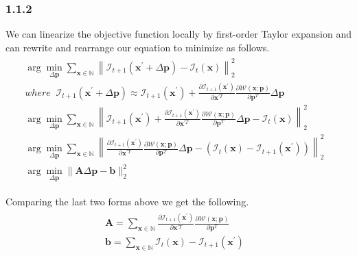 \documentclass[a4paper]{article}
\begin{document}
\subsubsection*{1.1.2}
We can linearize the objective function locally by first-order Taylor expansion and can rewrite and rearrange our equation to minimize as follows.
\begin{gather}
\begin{array}{c}
\arg \min _ { \Delta \mathbf { p } } \sum _ { \mathbf { x } \in \mathbb { N } } \left\| \mathcal { I } _ { t + 1 } ( \mathbf { x } ^ { \prime } + \Delta \mathbf { p } ) - \mathcal { I } _ { t } ( \mathbf { x } ) \right\| _ { 2 } ^ { 2 }
& \\
where \;\; \mathcal { I } _ { t + 1 } \left( \mathbf { x } ^ { \prime } + \Delta \mathbf { p } \right) \approx \mathcal { I } _ { t + 1 } \left( \mathbf { x } ^ { \prime } \right) + \frac { \partial \mathcal { I } _ { t + 1 } \left( \mathbf { x } ^ { \prime } \right) } { \partial \mathbf { x } ^ { \prime T } } \frac { \partial \mathcal { W } ( \mathbf { x } ; \mathbf { p } ) } { \partial \mathbf { p } ^ { T } } \Delta \mathbf { p }
& \\
\arg \min _ { \Delta \mathbf { p } } \sum _ { \mathbf { x } \in \mathbb { N } } \left\| \mathcal { I } _ { t + 1 } \left( \mathbf { x } ^ { \prime } \right) + \frac { \partial \mathcal { I } _ { t + 1 } \left( \mathbf { x } ^ { \prime } \right) } { \partial \mathbf { x } ^ { \prime T } } \frac { \partial \mathcal { W } ( \mathbf { x } ; \mathbf { p } ) } { \partial \mathbf { p } ^ { T } } \Delta \mathbf { p } - \mathcal { I } _ { t } ( \mathbf { x } ) \right\| _ { 2 } ^ { 2 }
& \\
\arg \min _ { \Delta \mathbf { p } } \sum _ { \mathbf { x } \in \mathbb { N } } \left\| \frac { \partial \mathcal { I } _ { t + 1 } \left( \mathbf { x } ^ { \prime } \right) } { \partial \mathbf { x } ^ { \prime T } } \frac { \partial \mathcal { W } ( \mathbf { x } ; \mathbf { p } ) } { \partial \mathbf { p } ^ { T } } \Delta \mathbf { p } - \left( \mathcal { I } _ { t } ( \mathbf { x } ) - \mathcal { I } _ { t + 1 } \left( \mathbf { x } ^ { \prime } \right) \right )\right\| _ { 2 } ^ { 2 }
& \\
\arg \min _ { \Delta \mathbf { p } } \| \mathbf { A } \Delta \mathbf { p } - \mathbf { b } \| _ { 2 } ^ { 2 }
\end{array}
\end{gather}

Comparing the last two forms above we get the following.
\begin{gather}
    \begin{array}{c}
    \mathbf { A } = \sum _ { \mathbf { x } \in \mathbb { N } } \frac { \partial \mathcal { I } _ { t + 1 } \left( \mathbf { x } ^ { \prime } \right) } { \partial \mathbf { x } ^ { \prime T } } \frac { \partial \mathcal { W } ( \mathbf { x } ; \mathbf { p } ) } { \partial \mathbf { p } ^ { T } }
    &  \\
    \mathbf { b } = \sum _ { \mathbf { x } \in \mathbb { N } } \mathcal { I } _ { t } ( \mathbf { x } ) - \mathcal { I } _ { t + 1 } \left( \mathbf { x } ^ { \prime } \right)
    \end{array}
\end{gather}
\end{document}
